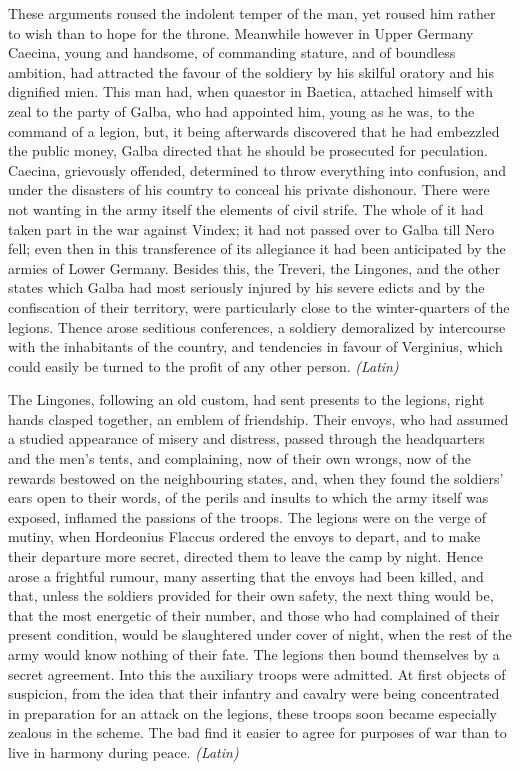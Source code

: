 These arguments roused the indolent temper of the man, yet roused him rather to wish than to hope for the throne. Meanwhile however in Upper Germany Caecina, young and handsome, of commanding stature, and of boundless ambition, had attracted the favour of the soldiery by his skilful oratory and his dignified mien. This man had, when quaestor in Baetica, attached himself with zeal to the party of Galba, who had appointed him, young as he was, to the command of a legion, but, it being afterwards discovered that he had embezzled the public money, Galba directed that he should be prosecuted for peculation. Caecina, grievously offended, determined to throw everything into confusion, and under the disasters of his country to conceal his private dishonour. There were not wanting in the army itself the elements of civil strife. The whole of it had taken part in the war against Vindex; it had not passed over to Galba till Nero fell; even then in this transference of its allegiance it had been anticipated by the armies of Lower Germany. Besides this, the Treveri, the Lingones, and the other states which Galba had most seriously injured by his severe edicts and by the confiscation of their territory, were particularly close to the winter-quarters of the legions. Thence arose seditious conferences, a soldiery demoralized by intercourse with the inhabitants of the country, and tendencies in favour of Verginius, which could easily be turned to the profit of any other person. \emph{(Latin)}


The Lingones, following an old custom, had sent presents to the legions, right hands clasped together, an emblem of friendship. Their envoys, who had assumed a studied appearance of misery and distress, passed through the headquarters and the men's tents, and complaining, now of their own wrongs, now of the rewards bestowed on the neighbouring states, and, when they found the soldiers' ears open to their words, of the perils and insults to which the army itself was exposed, inflamed the passions of the troops. The legions were on the verge of mutiny, when Hordeonius Flaccus ordered the envoys to depart, and to make their departure more secret, directed them to leave the camp by night. Hence arose a frightful rumour, many asserting that the envoys had been killed, and that, unless the soldiers provided for their own safety, the next thing would be, that the most energetic of their number, and those who had complained of their present condition, would be slaughtered under cover of night, when the rest of the army would know nothing of their fate. The legions then bound themselves by a secret agreement. Into this the auxiliary troops were admitted. At first objects of suspicion, from the idea that their infantry and cavalry were being concentrated in preparation for an attack on the legions, these troops soon became especially zealous in the scheme. The bad find it easier to agree for purposes of war than to live in harmony during peace. \emph{(Latin)}

